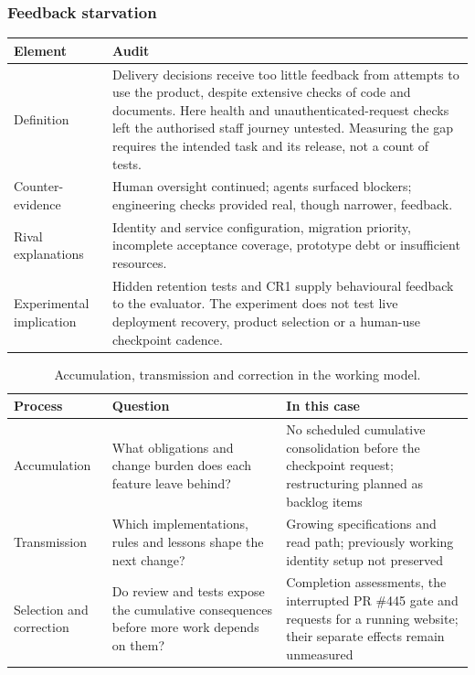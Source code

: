 \subsubsection{Feedback starvation}

{\small
\noindent
\begin{tabularx}{\textwidth}{@{}L{2.6cm}Y@{}}
\toprule
Element & Audit \\
\midrule
Definition & Delivery decisions receive too little feedback from attempts
to use the product, despite extensive checks of code and documents.
Here health and unauthenticated-request checks left the authorised
staff journey untested. Measuring the gap requires the intended task and
its release, not a count of tests. \\
Counter-evidence & Human oversight continued; agents surfaced blockers;
engineering checks provided real, though narrower, feedback. \\
Rival explanations & Identity and service configuration, migration priority,
incomplete acceptance coverage, prototype debt or insufficient resources. \\
Experimental implication & Hidden retention tests and CR1 supply behavioural
feedback to the evaluator. The experiment does not test live deployment
recovery, product selection or a human-use checkpoint cadence. \\
\bottomrule
\end{tabularx}
\par
}

\begin{table}[!htbp]
\centering\footnotesize
\caption{Accumulation, transmission and correction in the working model.}\label{tab:theory}
\begin{tabularx}{\textwidth}{@{}L{3.4cm}YL{4.6cm}@{}}
\toprule
Process & Question & In this case \\
\midrule
Accumulation & What obligations and change burden does each feature leave
behind?~\cite{lehman1980laws,lehman1997metrics} &
No scheduled cumulative consolidation before the checkpoint request;
restructuring planned as backlog items \\
Transmission & Which implementations, rules and lessons shape the next
change?~\cite{sinha2025illusion,pan2026swemaintain} &
Growing specifications and read path; previously working identity setup not preserved \\
Selection and correction & Do review and tests expose the cumulative
consequences before more work depends on them?~\cite{cohen2006review,yu2026habituation} &
Completion assessments, the interrupted PR \#445 gate and requests for
a running website; their separate effects remain unmeasured \\
\bottomrule
\end{tabularx}
\end{table}
\FloatBarrier

